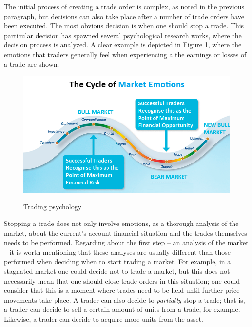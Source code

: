 The initial process of creating a trade order is complex, as noted in the previous paragraph, but decisions can also take place after a number of trade orders have been executed. The most obvious decision is when one should stop a trade. This particular decision has spawned several psychological research works, where the decision process is analyzed. A clear example is depicted in Figure \ref{figure:trading-psychology}, where the emotions that traders generally feel when experiencing a the earnings or losses of a trade are shown.

\begin{figure}
\caption{Trading psychology}
\centering
\includegraphics[width=1.0\textwidth]{img/trading-psychology.png}
\label{figure:trading-psychology}
\end{figure}

Stopping a trade does not only involve emotions, as a thorough analysis of the market, about the current's account financial situation and the trades themselves needs to be performed. Regarding about the first step -- an analysis of the market -- it is worth mentioning that these analyses are usually different than those performed when deciding when to start trading a market. For example, in a stagnated market one could decide not to trade a market, but this does not necessarily mean that one should close trade orders in this situation; one could consider that this is a moment where trades need to be held until further price movements take place. A trader can also decide to \textit{partially} stop a trade; that is, a trader can decide to sell a certain amount of units from a trade, for example. Likewise, a trader can decide to acquire more units from the asset.

